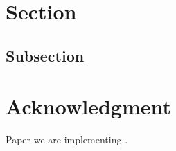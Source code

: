 \documentclass[conference]{IEEEtran}
\begin{document}
	
	
	
	
	\section{Section}
	
	\subsection{Subsection}
	
	\section*{Acknowledgment}
	
	Paper we are implementing \cite{2022_Leveraging_sound}.
	
	\nocite{*}
	\printbibliography
	
\end{document}
